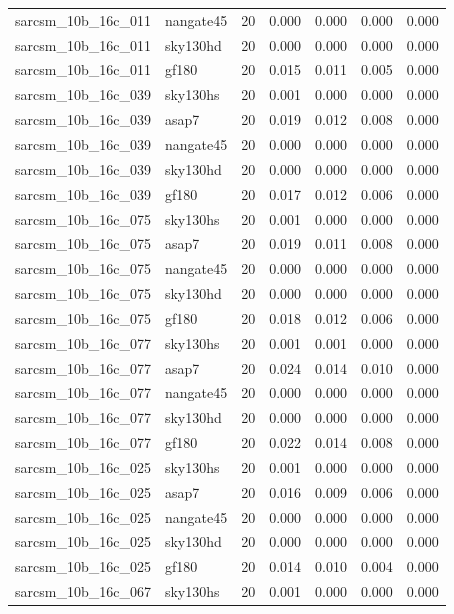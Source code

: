 \begin{tabular}{llrrrrr}
sarcsm\_10b\_16c\_011 & nangate45 & 20 & 0.000 & 0.000 & 0.000 & 0.000 \\
sarcsm\_10b\_16c\_011 & sky130hd & 20 & 0.000 & 0.000 & 0.000 & 0.000 \\
sarcsm\_10b\_16c\_011 & gf180 & 20 & 0.015 & 0.011 & 0.005 & 0.000 \\
sarcsm\_10b\_16c\_039 & sky130hs & 20 & 0.001 & 0.000 & 0.000 & 0.000 \\
sarcsm\_10b\_16c\_039 & asap7 & 20 & 0.019 & 0.012 & 0.008 & 0.000 \\
sarcsm\_10b\_16c\_039 & nangate45 & 20 & 0.000 & 0.000 & 0.000 & 0.000 \\
sarcsm\_10b\_16c\_039 & sky130hd & 20 & 0.000 & 0.000 & 0.000 & 0.000 \\
sarcsm\_10b\_16c\_039 & gf180 & 20 & 0.017 & 0.012 & 0.006 & 0.000 \\
sarcsm\_10b\_16c\_075 & sky130hs & 20 & 0.001 & 0.000 & 0.000 & 0.000 \\
sarcsm\_10b\_16c\_075 & asap7 & 20 & 0.019 & 0.011 & 0.008 & 0.000 \\
sarcsm\_10b\_16c\_075 & nangate45 & 20 & 0.000 & 0.000 & 0.000 & 0.000 \\
sarcsm\_10b\_16c\_075 & sky130hd & 20 & 0.000 & 0.000 & 0.000 & 0.000 \\
sarcsm\_10b\_16c\_075 & gf180 & 20 & 0.018 & 0.012 & 0.006 & 0.000 \\
sarcsm\_10b\_16c\_077 & sky130hs & 20 & 0.001 & 0.001 & 0.000 & 0.000 \\
sarcsm\_10b\_16c\_077 & asap7 & 20 & 0.024 & 0.014 & 0.010 & 0.000 \\
sarcsm\_10b\_16c\_077 & nangate45 & 20 & 0.000 & 0.000 & 0.000 & 0.000 \\
sarcsm\_10b\_16c\_077 & sky130hd & 20 & 0.000 & 0.000 & 0.000 & 0.000 \\
sarcsm\_10b\_16c\_077 & gf180 & 20 & 0.022 & 0.014 & 0.008 & 0.000 \\
sarcsm\_10b\_16c\_025 & sky130hs & 20 & 0.001 & 0.000 & 0.000 & 0.000 \\
sarcsm\_10b\_16c\_025 & asap7 & 20 & 0.016 & 0.009 & 0.006 & 0.000 \\
sarcsm\_10b\_16c\_025 & nangate45 & 20 & 0.000 & 0.000 & 0.000 & 0.000 \\
sarcsm\_10b\_16c\_025 & sky130hd & 20 & 0.000 & 0.000 & 0.000 & 0.000 \\
sarcsm\_10b\_16c\_025 & gf180 & 20 & 0.014 & 0.010 & 0.004 & 0.000 \\
sarcsm\_10b\_16c\_067 & sky130hs & 20 & 0.001 & 0.000 & 0.000 & 0.000 \\

\end{tabular}
